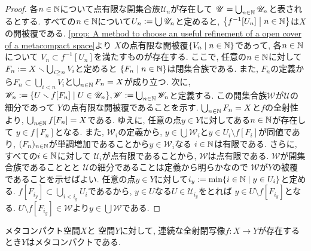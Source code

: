 \documentclass[uplatex, dvipdfmx, a4paper, 12pt, class=jsbook, crop=false]{standalone}
\begin{document}
\begin{proof}
	各$ n \in \mathbb{N} $について点有限な開集合族$ \mathscr{U}_n $が存在して
	$ \mathscr{U} = \bigcup_{n \in \mathbb{N}} \mathscr{U}_n $と表されるとする.
	すべての$ n \in \mathbb{N} $について$ U_n \mathrel{:=} \bigcup \mathscr{U}_n $と定めると,
	$ \setcomp{f^{-1}[U_n]}{n \in \N} $は$ X $の開被覆である.
	\cref{prop: A method to choose an useful refinement of a open cover of a metacompact space}より
	$ X $の点有限な開被覆$ \setcomp{V_n}{n \in \N} $であって, 各$ n \in \mathbb{N} $について
	$ V_n \subset f^{-1}[U_n] $を満たすものが存在する.
	ここで, 任意の$ n \in \mathbb{N} $に対して
	$ F_n \mathrel{:=} X \smallsetminus \bigcup_{i\geq n} V_i $と定めると
	$ \setcomp{F_n}{n \in \N} $は閉集合族である. 
	また, $ F_n $の定義から$ F_n \subset \bigcup_{i < n} V_i$と$ \bigcup_{n \in \mathbb{N}} F_n = X $が成り立つ.
	次に, $ \mathscr{W}_n \defeq \setcomp{U \setminus f[F_n]}{U \in \mathscr{U}_n}, 
	\mathscr{W} \defeq \bigcup_{n \in \N} \mathscr{W}_n $と定義する.
	この開集合族$ \mathscr{W} $が$ \mathscr{U} $の細分であって
	$ Y $の点有限な開被覆であることを示す.
	$ \bigcup_{n \in \mathbb{N}} F_n = X $と$ f $の全射性より, $ \bigcup_{n \in \mathbb{N}} f[F_n] = X $である.
	ゆえに, 任意の点$ y \in Y $に対してある$ n \in \mathbb{N} $が存在して
	$ y \in f[F_n] $となる. また, $ \mathscr{W}_i $の定義から,
	$ y \in \bigcup \mathscr{W}_i $と$ y \in U_i \setminus f[F_i] $が同値であり,
	$ (F_n)_{n \in \mathbb{N}} $が単調増加であることから$ y \in \mathscr{W}_i $なる
	$ i \in \mathbb{N} $は有限である. さらに, すべての$ i \in \mathbb{N} $に対して
	$ \mathscr{U}_i $が点有限であることから, $ \mathscr{W} $は点有限である. 
	$ \mathscr{W} $が開集合族であることとと
	$ \mathscr{U} $の細分であることは定義から明らかなので
	$ \mathscr{W} $が$ Y $の被覆であることを示せばよい.
	任意の点$ y \in Y $に対して$ i_y \defeq \min \setcomp{i \in \N}{y \in U_i} $と定める.
	$ f[F_{i_y}] \subset \bigcup_{i < i_y} U_i $であるから,
	$ y \in U $なる$ U \in \mathscr{U}_{i_y} $をとれば
	$ y \in U \setminus f[F_{i_y}] $となる.
	$ U \setminus f[F_{i_y}] \in \mathscr{W} $より$ y \in \bigcup \mathscr{W} $である.	
\end{proof}

\begin{theorem}[Worrell]
	\label{thm:Worrell's Theorem}
	メタコンパクト空間$ X $と \Hausdorff 空間$ Y $に対して, 
	連続な全射閉写像$ f \colon X \to Y $が存在するとき$ Y $はメタコンパクトである.
\end{theorem}
\end{document}
